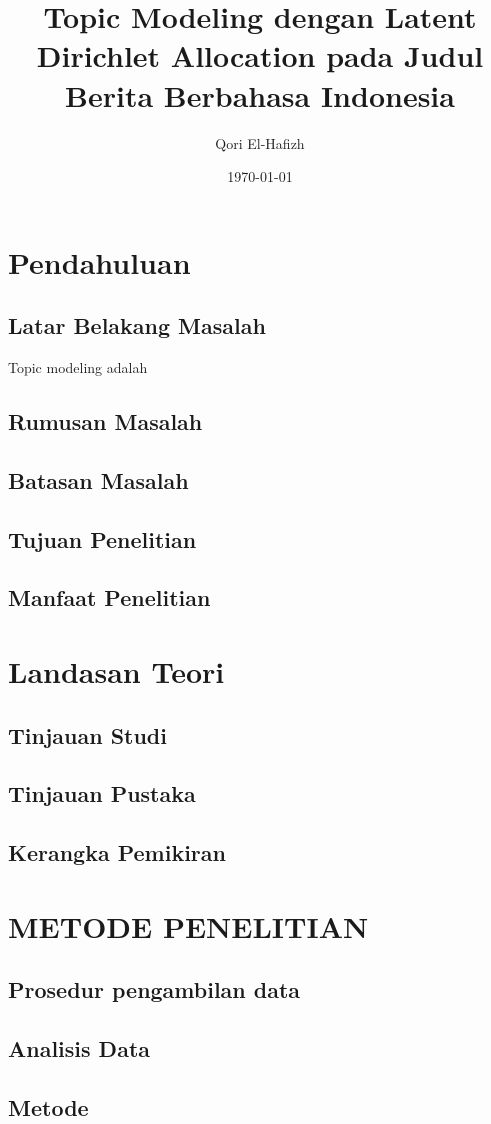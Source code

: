 \documentclass[a4paper,11pt]{report}
\title{Topic Modeling dengan Latent Dirichlet Allocation pada Judul Berita Berbahasa Indonesia}
\author{Qori El-Hafizh}
\date{\today}
\begin{document}
\maketitle

\begin{abstract}
\end{abstract}

\tableofcontents

\chapter{Pendahuluan}
\section{Latar Belakang Masalah}
Topic modeling adalah \cite{surjandari_mining_2018}
\section{Rumusan Masalah}
\section{Batasan Masalah}
\section{Tujuan Penelitian}
\section{Manfaat Penelitian}

\chapter{Landasan Teori}
\section{Tinjauan Studi}
\section{Tinjauan Pustaka}
\section{Kerangka Pemikiran}

\chapter{METODE PENELITIAN}
\section{Prosedur pengambilan data}
\section{Analisis Data}
\section{Metode}

\printbibliography
\end{document}
